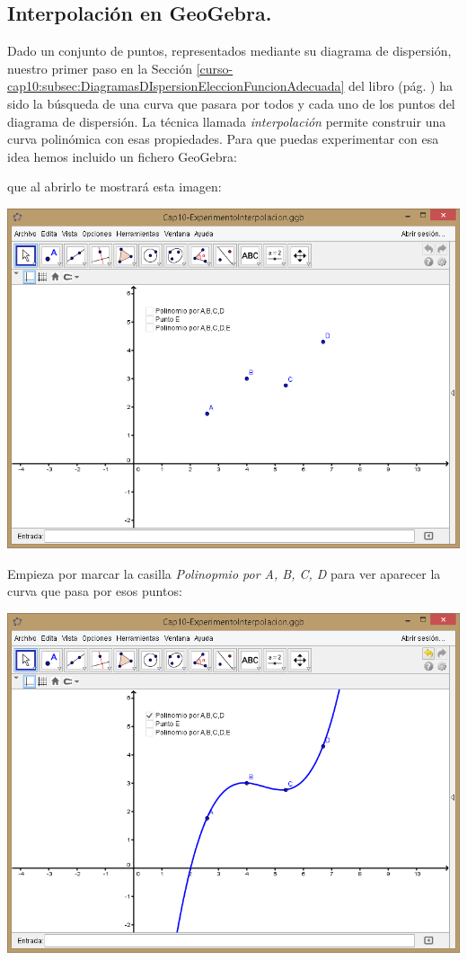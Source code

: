 \documentclass[10pt,a4paper]{article}\usepackage[]{graphicx}\usepackage[]{color}
\begin{document}
\subsection{Interpolación en GeoGebra.}

Dado un conjunto de puntos, representados mediante su diagrama de dispersión, nuestro primer paso en la Sección \ref{curso-cap10:subsec:DiagramasDIspersionEleccionFuncionAdecuada} del libro (pág. \pageref{curso-cap10:subsec:DiagramasDIspersionEleccionFuncionAdecuada}) ha sido la búsqueda de una curva que pasara por todos y cada uno de los puntos del diagrama de dispersión. La técnica llamada {\em interpolación} permite construir una curva polinómica con esas propiedades. Para que puedas experimentar con esa idea hemos incluido un fichero GeoGebra:
\begin{center}
\end{center}
que al abrirlo te mostrará esta imagen:
\begin{center}
    \includegraphics[width=14cm]{../fig/Tut10-15.png}
\end{center}
Empieza por marcar la casilla {\em Polinopmio por A, B, C, D} para ver aparecer la curva que pasa por esos puntos:
\begin{center}
    \includegraphics[width=14cm]{../fig/Tut10-16.png}
\end{center}
\end{document}
